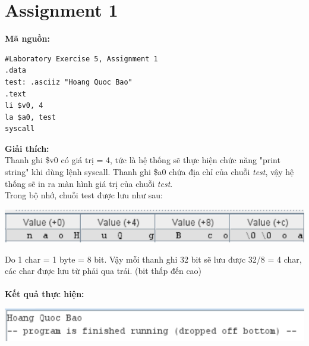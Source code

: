 \documentclass[12pt,a4paper,oneside]{article}
\begin{document}
\section*{Assignment 1}
\textbf{Mã nguồn:}
\begin{lstlisting}
#Laboratory Exercise 5, Assignment 1
.data
test: .asciiz "Hoang Quoc Bao"
.text
li $v0, 4
la $a0, test
syscall
\end{lstlisting}
\textbf{Giải thích:}\\ Thanh ghi \$v0 có giá trị = 4, tức là hệ thống sẽ thực hiện chức năng "print string" khi dùng lệnh syscall. Thanh ghi \$a0 chứa địa chỉ của chuỗi \textit{test}, vậy hệ thống sẽ in ra màn hình giá trị của chuỗi \textit{test}.\\
Trong bộ nhớ, chuỗi test được lưu như sau: \begin{center}
\includegraphics[scale=1]{1.1}
\end{center}
Do 1 char = 1 byte = 8 bit. Vậy mỗi thanh ghi 32 bit sẽ lưu được 32/8 = 4 char, các char được lưu từ phải qua trái. (bit thấp đến cao)\\\\
\textbf{Kết quả thực hiện: } \begin{center}
\includegraphics[scale=1]{1}
\end{center}
\pagebreak
\end{document}
